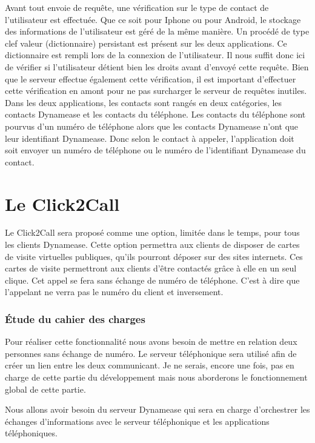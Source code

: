 Avant tout envoie de requête, une vérification sur le type de contact de l'utilisateur est effectuée. Que ce soit pour Iphone ou pour Android, le stockage des informations de l'utilisateur est géré de la même manière. Un procédé de type clef valeur (dictionnaire) persistant est présent sur les deux applications. Ce dictionnaire est rempli lors de la connexion de l'utilisateur. Il nous suffit donc ici de vérifier si l'utilisateur détient bien les droits avant d'envoyé cette requête. Bien que le serveur effectue également cette vérification, il est important d'effectuer cette vérification en amont pour ne pas surcharger le serveur de requêtes inutiles.\\

Dans les deux applications, les contacts sont rangés en deux catégories, les contacts Dynamease et les contacts du téléphone. Les contacts du téléphone sont pourvus d'un numéro de téléphone alors que les contacts Dynamease n'ont que leur identifiant Dynamease. Donc selon le contact à appeler, l'application doit soit envoyer un numéro de téléphone ou le numéro de l'identifiant Dynamease du contact.

\section{Le Click2Call}

Le Click2Call sera proposé comme une option, limitée dans le temps, pour tous les clients Dynamease. Cette option permettra aux clients de disposer de cartes de visite virtuelles publiques, qu'ils pourront déposer sur des sites internets. Ces cartes de visite permettront aux clients d'être contactés grâce à elle en un seul clique. Cet appel se fera sans échange de numéro de téléphone. C'est à dire que l'appelant ne verra pas le numéro du client et inversement.

\subsubsection{Étude du cahier des charges}

Pour réaliser cette fonctionnalité nous avons besoin de mettre en relation deux personnes sans échange de numéro. Le serveur téléphonique sera utilisé afin de créer un lien entre les deux communicant. Je ne serais, encore une fois, pas en charge de cette partie du développement mais nous aborderons le fonctionnement global de cette partie.

Nous allons avoir besoin du serveur Dynamease qui sera en charge d'orchestrer les échanges d'informations avec le serveur téléphonique et les applications téléphoniques.

